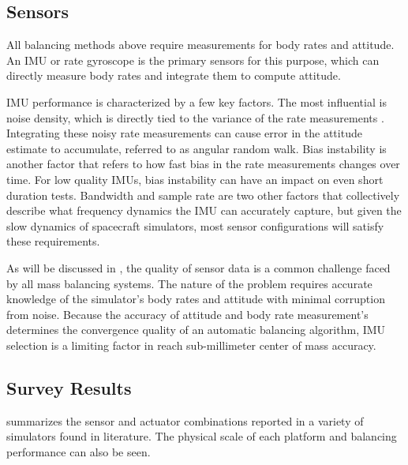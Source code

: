 \subsection{Sensors}

All balancing methods above require measurements for body rates and attitude. An IMU or rate gyroscope is the primary sensors for this purpose, which can directly measure body rates and integrate them to compute attitude. 

IMU performance is characterized by a few key factors. The most influential is noise density, which is directly tied to the variance of the rate measurements \cite{unsal_estimation_2012}. Integrating these noisy rate measurements can cause error in the attitude estimate to accumulate, referred to as angular random walk. Bias instability is another factor that refers to how fast bias in the rate measurements changes over time. For low quality IMUs, bias instability can have an impact on even short duration tests. Bandwidth and sample rate are two other factors that collectively describe what frequency dynamics the IMU can accurately capture, but given the slow dynamics of spacecraft simulators, most sensor configurations will satisfy these requirements.

As will be discussed in , the quality of sensor data is a common challenge faced by all mass balancing systems. The nature of the problem requires accurate knowledge of the simulator's body rates and attitude with minimal corruption from noise. Because the accuracy of attitude and body rate measurement's determines the convergence quality of an automatic balancing algorithm, IMU selection is a limiting factor in reach sub-millimeter center of mass accuracy. 

\subsection{Survey Results}

 summarizes the sensor and actuator combinations reported in a variety of simulators found in literature. The physical scale of each platform and balancing performance can also be seen. 

